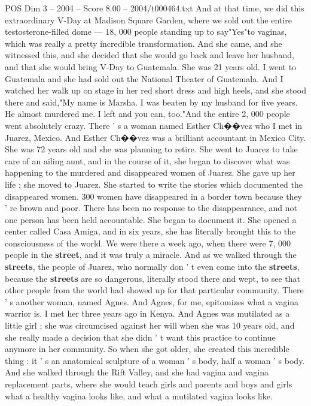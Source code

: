 \begin{textsample}{POS Dim 3 – 2004 – Score 8.00 – 2004/t000464.txt}
And at that time, we did this extraordinary V-Day at Madison Square Garden, where we sold out the entire testosterone-filled dome — 18, 000 people standing up to say"Yes"to vaginas, which was really a pretty incredible transformation.
And she came, and she witnessed this, and she decided that she would go back and leave her husband, and that she would bring V-Day to Guatemala.
She was 21 years old.
I went to Guatemala and she had sold out the National Theater of Guatemala.
And I watched her walk up on stage in her red short dress and high heels, and she stood there and said,"My name is Marsha.
I was beaten by my husband for five years.
He almost murdered me.
I left and you can, too."And the entire 2, 000 people went absolutely crazy.
There ' s a woman named Esther Ch{\EmojiFont �}{\EmojiFont �}vez who I met in Juarez, Mexico.
And Esther Ch{\EmojiFont �}{\EmojiFont �}vez was a brilliant accountant in Mexico City.
She was 72 years old and she was planning to retire.
She went to Juarez to take care of an ailing aunt, and in the course of it, she began to discover what was happening to the murdered and disappeared women of Juarez.
She gave up her life ; she moved to Juarez.
She started to write the stories which documented the disappeared women. 300 women have disappeared in a border town because they ' re brown and poor.
There has been no response to the disappearance, and not one person has been held accountable.
She began to document it.
She opened a center called Casa Amiga, and in six years, she has literally brought this to the consciousness of the world.
We were there a week ago, when there were 7, 000 people in the \textbf{street}, and it was truly a miracle.
And as we walked through the \textbf{streets}, the people of Juarez, who normally don ' t even come into the \textbf{streets}, because the \textbf{streets} are so dangerous, literally stood there and wept, to see that other people from the world had showed up for that particular community.
There ' s another woman, named Agnes.
And Agnes, for me, epitomizes what a vagina warrior is.
I met her three years ago in Kenya.
And Agnes was mutilated as a little girl ; she was circumcised against her will when she was 10 years old, and she really made a decision that she didn ' t want this practice to continue anymore in her community.
So when she got older, she created this incredible thing : it ' s an anatomical sculpture of a woman ' s body, half a woman ' s body.
And she walked through the Rift Valley, and she had vagina and vagina replacement parts, where she would teach girls and parents and boys and girls what a healthy vagina looks like, and what a mutilated vagina looks like.

\end{textsample}
